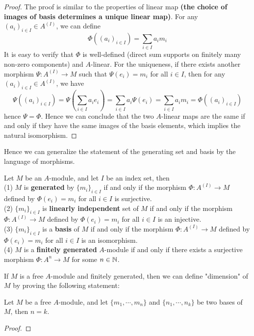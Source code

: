 \documentclass[12pt,a4paper]{article}
\begin{document}
\begin{proof}
    The proof is similar to the properties of linear map \textbf{(the choice of images of basis determines a unique linear map)}. For any \((a_i)_{i \in I} \in A^{(I)}\), we can define \[\Phi((a_i)_{i \in I}) = \sum_{i \in I} a_i m_i\]
    It is easy to verify that \(\Phi\) is well-defined (direct sum supports on finitely many non-zero components) and \(A\)-linear. For the uniqueness, if there exists another morphism \(\Psi: A^{(I)} \to M\) such that \(\Psi(e_i) = m_i\) for all \(i \in I\), then for any \((a_i)_{i \in I} \in A^{(I)}\), we have
    \[\Psi((a_i)_{i \in I}) = \Psi(\sum_{i \in I} a_i e_i) = \sum_{i \in I} a_i \Psi(e_i) = \sum_{i \in I} a_i m_i = \Phi((a_i)_{i \in I})\]
    hence \(\Psi = \Phi\). Hence we can conclude that the two \(A\)-linear maps are the same if and only if they have the same images of the basis elements, which implies the natural isomorphism.
\end{proof}

Hence we can generalize the statement of the generating set and basis by the language of morphisms.
\begin{corollary}
    Let \(M\) be an \(A\)-module, and let \(I\) be an index set, then\\
    (1) \(M\) is \textbf{generated} by \(\{m_i\}_{i \in I}\) if and only if the morphism \(\Phi: A^{(I)} \to M\) defined by \(\Phi(e_i) = m_i\) for all \(i \in I\) is surjective.\\
    (2) \(\{m_i\}_{i \in I}\) is \textbf{linearly independent} set of \(M\) if and only if the morphism \(\Phi: A^{(I)} \to M\) defined by \(\Phi(e_i) = m_i\) for all \(i \in I\) is an injective.\\
    (3) \(\{m_i\}_{i \in I}\) is a \textbf{basis} of \(M\) if and only if the morphism \(\Phi: A^{(I)} \to M\) defined by \(\Phi(e_i) = m_i\) for all \(i \in I\) is an isomorphism.\\
    (4) \(M\) is a \textbf{finitely generated} \(A\)-module if and only if there exists a surjective morphism \(\Phi: A^n \to M\) for some \(n \in \mathbb{N}\).
\end{corollary}


    If \(M\) is a free \(A\)-module and finitely generated, then we can define "dimension" of \(M\)  by proving the following statement:


    \begin{lemmaplain}
        Let \(M\) be a free \(A\)-module, and let \(\{m_1,\cdots,m_n\}\) and \(\{n_1,\cdots,n_k\}\) be two bases of \(M\), then \(n=k\).
    \end{lemmaplain}
    \begin{proof}
    \end{proof}
\end{document}
